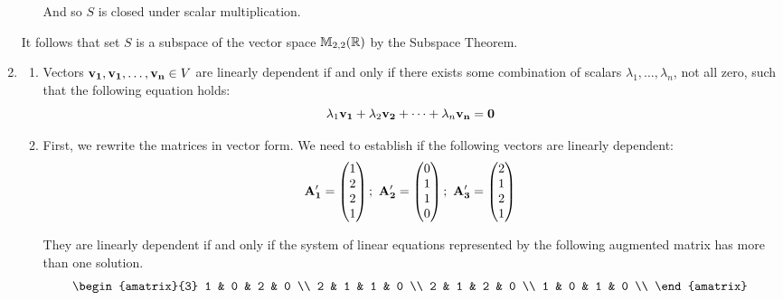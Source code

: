 \begin{enumerate}
\begin{itemize}
                And so $S$ is closed under scalar multiplication.
        \end{itemize}

        It follows that set $S$ is a subspace of the vector
        space $\mathbb{M}_{2,2}(\mathbb{R})$ by the Subspace Theorem.

    \item
        \begin{enumerate}
            \item
                Vectors $\mathbf{v_1}, \mathbf{v_1}, \dots, \mathbf{v_n} \in V$ are
                linearly dependent if and only if there exists some combination of scalars
                $\lambda_1, \dots, \lambda_n$, not all zero,
                such that the following equation holds:
                $$\lambda_1\mathbf{v_1} + \lambda_2\mathbf{v_2} + \dots + \lambda_n\mathbf{v_n} = \mathbf{0}$$
            \item
                First, we rewrite the matrices in vector form. We need
                to establish if the following vectors are linearly
                dependent:
                $$
                \mathbf{A'_1} = \begin{pmatrix}1 \\ 2 \\ 2 \\ 1\end{pmatrix};~
                \mathbf{A'_2} = \begin{pmatrix}0 \\ 1 \\ 1 \\ 0\end{pmatrix};~
                \mathbf{A'_3} = \begin{pmatrix}2 \\ 1 \\ 2 \\ 1\end{pmatrix}
                $$

                They are linearly dependent if and only if the system of
                linear equations represented by the following augmented
                matrix has more than one solution.
                $$
                    \begin{amatrix}{3}
                        1 & 0 & 2 & 0 \\
                        2 & 1 & 1 & 0 \\
                        2 & 1 & 2 & 0 \\
                        1 & 0 & 1 & 0 \\
                    \end{amatrix}
                $$


\end{enumerate}
\end{enumerate}
